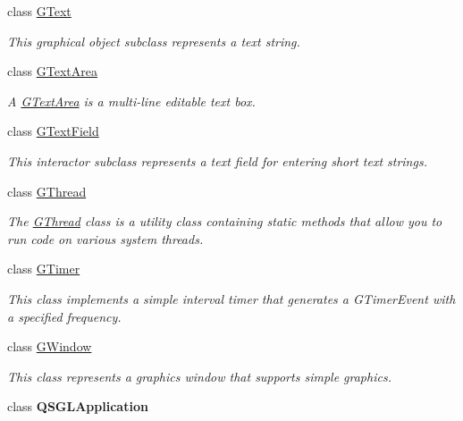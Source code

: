 \begin{DoxyCompactItemize}
class \mbox{\hyperlink{classsgl_1_1GText}{G\+Text}}
\begin{DoxyCompactList}\small\item\em This graphical object subclass represents a text string. \end{DoxyCompactList}\item 
class \mbox{\hyperlink{classsgl_1_1GTextArea}{G\+Text\+Area}}
\begin{DoxyCompactList}\small\item\em A \mbox{\hyperlink{classsgl_1_1GTextArea}{G\+Text\+Area}} is a multi-\/line editable text box. \end{DoxyCompactList}\item 
class \mbox{\hyperlink{classsgl_1_1GTextField}{G\+Text\+Field}}
\begin{DoxyCompactList}\small\item\em This interactor subclass represents a text field for entering short text strings. \end{DoxyCompactList}\item 
class \mbox{\hyperlink{classsgl_1_1GThread}{G\+Thread}}
\begin{DoxyCompactList}\small\item\em The \mbox{\hyperlink{classsgl_1_1GThread}{G\+Thread}} class is a utility class containing static methods that allow you to run code on various system threads. \end{DoxyCompactList}\item 
class \mbox{\hyperlink{classsgl_1_1GTimer}{G\+Timer}}
\begin{DoxyCompactList}\small\item\em This class implements a simple interval timer that generates a {\ttfamily G\+Timer\+Event} with a specified frequency. \end{DoxyCompactList}\item 
class \mbox{\hyperlink{classsgl_1_1GWindow}{G\+Window}}
\begin{DoxyCompactList}\small\item\em This class represents a graphics window that supports simple graphics. \end{DoxyCompactList}\item 
class {\bfseries Q\+S\+G\+L\+Application}
\end{DoxyCompactItemize}
